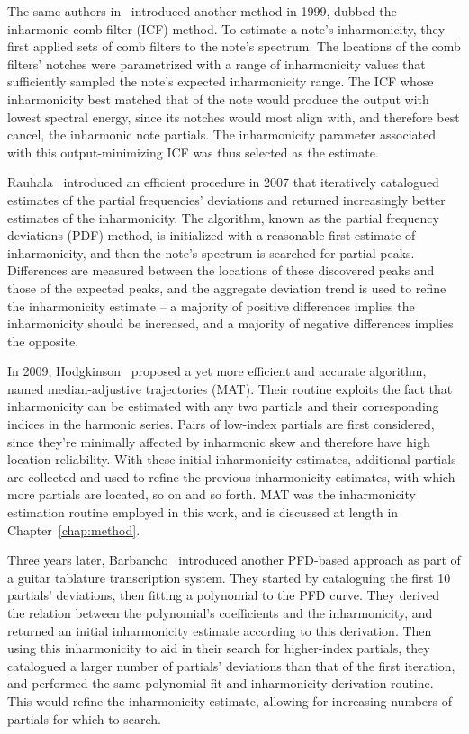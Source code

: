 \documentclass[12pt]{cmuthesis}
\begin{document}
 The same authors in~\cite{galembo1999} introduced another method in 1999, dubbed the inharmonic comb filter (ICF) method. To estimate a note's inharmonicity, they first applied sets of comb filters to the note's spectrum. The locations of the comb filters' notches were parametrized with a range of inharmonicity values that sufficiently sampled the note's expected inharmonicity range. The ICF whose inharmonicity best matched that of the note would produce the output with lowest spectral energy, since its notches would most align with, and therefore best cancel, the inharmonic note partials. The inharmonicity parameter associated with this output-minimizing ICF was thus selected as the estimate.
 
Rauhala~\cite{rauhala2007} introduced an efficient procedure in 2007 that iteratively catalogued estimates of the partial frequencies' deviations and returned increasingly better estimates of the inharmonicity. The algorithm, known as the partial frequency deviations (PDF) method, is initialized with a reasonable first estimate of inharmonicity, and then the note's spectrum is searched for partial peaks. Differences are measured between the locations of these discovered peaks and those of the expected peaks, and the aggregate deviation trend is used to refine the inharmonicity estimate -- a majority of positive differences implies the inharmonicity should be increased, and a majority of negative differences implies the opposite.

In 2009, Hodgkinson~\cite{hodgkinson2009} proposed a yet more efficient and accurate algorithm, named median-adjustive trajectories (MAT). Their routine exploits the fact that inharmonicity can be estimated with any two partials and their corresponding indices in the harmonic series. Pairs of low-index partials are first considered, since they're minimally affected by inharmonic skew and therefore have high location reliability. With these initial inharmonicity estimates, additional partials are collected and used to refine the previous inharmonicity estimates, with which more partials are located, so on and so forth. MAT was the inharmonicity estimation routine employed in this work, and is discussed at length in Chapter~\ref{chap:method}.

Three years later, Barbancho~\cite{barbanchoi2012} introduced another PFD-based approach as part of a guitar tablature transcription system. They started by cataloguing the first 10 partials' deviations, then fitting a polynomial to the PFD curve. They derived the relation between the polynomial's coefficients and the inharmonicity, and returned an initial inharmonicity estimate according to this derivation. Then using this inharmonicity to aid in their search for higher-index partials, they catalogued a larger number of partials' deviations than that of the first iteration, and performed the same polynomial fit and inharmonicity derivation routine. This would refine the inharmonicity estimate, allowing for increasing numbers of partials for which to search.
\end{document}
